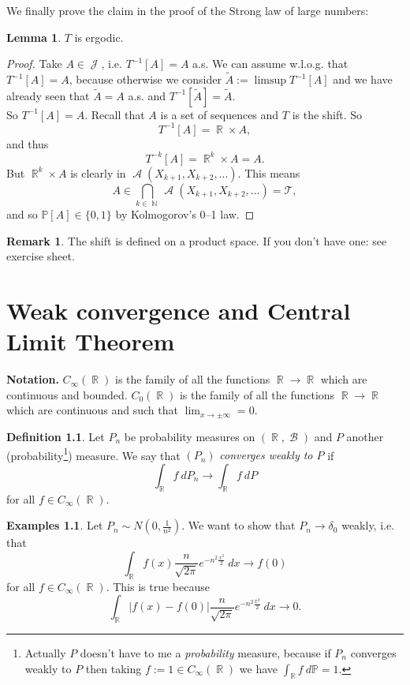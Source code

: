 \documentclass[12pt,a4paper]{report}
\theoremstyle{definition}
\newtheorem{lemma}[theorem]{Lemma}
\newtheorem{definition}[theorem]{Definition}
\newtheorem*{examples}{Examples}
\newtheorem*{remark}{Remark}
\theoremstyle{num.custom-title}
\DeclareMathOperator{\A}{\mathcal{A}}
\DeclareMathOperator{\B}{\mathcal{B}}
\DeclareMathOperator{\J}{\mathcal{J}}
\DeclareMathOperator{\N}{\mathbb{N}}
\DeclareMathOperator{\R}{\mathbb{R}}
\newcommand{\T}{\mathcal{T}}
\renewcommand{\1}{\mathbbm{1}}
\renewcommand{\P}{\mathbb{P}}
\begin{document}
We finally prove the claim in the proof of the Strong law of large numbers:

\begin{lemma}
$T$ is ergodic.
\begin{proof}
Take $A \in \J$, i.e. $T^{-1}[A]=A$ a.s. We can assume w.l.o.g. that $T^{-1}[A]=A$, because otherwise we consider $\tilde{A} := \limsup T^{-1}[A]$ and we have already seen that $\tilde{A}=A$ a.s. and $T^{-1}[\tilde{A}]=\tilde{A}$.\\
So $T^{-1}[A]=A$. Recall that $A$ is a set of sequences and $T$ is the shift. So
\[
T^{-1}[A] = \R \times A,
\]
and thus
\[
T^{-k}[A] = \R^k \times A = A.
\]
But $\R^k \times A$ is clearly in $\A(X_{k+1},X_{k+2},...)$. This means
\[
A \in \bigcap_{k \in \N} \A(X_{k+1},X_{k+2},\ldots) = \T,
\]
and so $\P[A] \in \{0,1\}$ by Kolmogorov's 0--1 law.
\end{proof}
\end{lemma}

\begin{remark}
The shift is defined on a product space. If you don't have one: see exercise sheet.
\end{remark}


\chapter{Weak convergence and Central Limit Theorem}

\textbf{Notation.} $C_\infty(\R)$ is the family of all the functions $\R \to \R$ which are continuous and bounded. $C_0(\R)$ is the family of all the functions $\R \to \R$ which are continuous and such that $\lim_{x \to \pm \infty} = 0$. 


\begin{definition}
Let $P_n$ be probability measures on $(\R,\B)$ and $P$ another (probability\footnote{Actually $P$ doesn't have to me a \emph{probability} measure, because if $P_n$ converges weakly to $P$ then taking $f:=1 \in C_\infty(\R)$ we have $\int_{\R} f \ d\P = 1$.}) measure. We say that $(P_n)$ \emph{converges weakly to $P$} if 
\[
\int_{\R} f \ dP_n \to \int_{\R} f \ dP
\]
for all $f \in C_\infty(\R)$.
\end{definition}

\begin{examples}
Let $P_n \sim N(0,\frac{1}{n^2})$. We want to show that $P_n \to \delta_0$ weakly, i.e. that
\[
\int_{\R} f(x) \frac{n}{\sqrt{2\pi}} e^{-n^2 \frac{x^2}{2}} \ dx \to f(0)
\]
for all $f \in C_\infty(\R)$. This is true because
\[
\int_{\R} |f(x)-f(0)| \frac{n}{\sqrt{2\pi}} e^{-n^2 \frac{x^2}{2}} \ dx \to 0.
\]
\end{examples}
\end{document}

